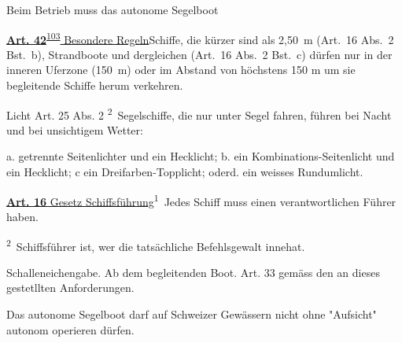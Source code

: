 Beim Betrieb muss das autonome Segelboot 

\href{https://www.fedlex.admin.ch/eli/cc/1979/337_337_337/de\#art_42}{\textbf{Art. 42}}\textsuperscript{\href{https://www.fedlex.admin.ch/eli/cc/1979/337_337_337/de\#fn-d6e2948}{103}}\href{https://www.fedlex.admin.ch/eli/cc/1979/337_337_337/de\#art_42}{ Besondere Regeln}Schiffe, die kürzer sind als 2,50 m (Art. 16 Abs. 2 Bst. b), Strandboote und dergleichen (Art. 16 Abs. 2 Bst. c) dürfen nur in der inneren Uferzone (150 m) oder im Abstand von höchstens 150 m um sie begleitende Schiffe herum verkehren.

Licht Art. 25 Abs. 2 
\textsuperscript{2} Segelschiffe, die nur unter Segel fahren, führen bei Nacht und bei unsichtigem Wetter:

a. getrennte Seitenlichter und ein Hecklicht; b. ein Kombinations-Seitenlicht und ein Hecklicht; c ein Dreifarben-Topplicht; oderd. ein weisses Rundumlicht. 


\href{https://www.fedlex.admin.ch/eli/cc/1976/725_724_724/de\#art_16}{\textbf{Art. 16}  Gesetz 
Schiffsführung}\textsuperscript{1} Jedes Schiff muss einen verantwortlichen Führer haben.

\textsuperscript{2} Schiffsführer ist, wer die tatsächliche Befehlsgewalt innehat.

 

Schalleneichengabe. Ab dem begleitenden Boot. Art. 33 gemäss den an dieses gestetllten Anforderungen.

 Das autonome Segelboot darf auf Schweizer Gewässern nicht ohne "Aufsicht" autonom operieren dürfen. 







